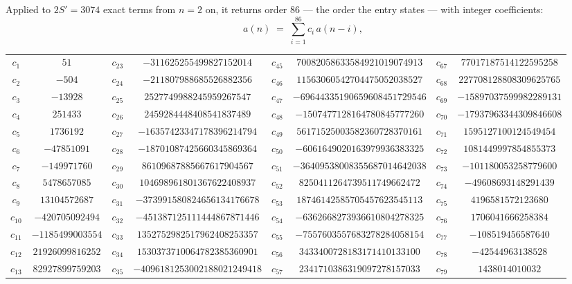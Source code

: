 \documentclass[11pt,a4paper]{article}
\theoremstyle{plain}
\theoremstyle{definition}
\begin{document}
Applied to $2S'=3074$ exact terms from $n=2$ on, it returns order $86$ --- the
order the entry states --- with integer coefficients:
\[
a(n)\;=\;\sum_{i=1}^{86}c_i\,a(n-i),
\]
\begin{center}\small
\begin{tabular}{cccccccc}
$c_{1}$ & $51$ & $c_{23}$ & $-311625255499827152014$ & $c_{45}$ & $70082058633584921019074913$ & $c_{67}$ & $77017187514122595258$ \\
$c_{2}$ & $-504$ & $c_{24}$ & $-211807988685526882356$ & $c_{46}$ & $11563060542704475052038527$ & $c_{68}$ & $227708128808309625765$ \\
$c_{3}$ & $-13928$ & $c_{25}$ & $2527749988245959267547$ & $c_{47}$ & $-69644335190659608451729546$ & $c_{69}$ & $-15897037599982289131$ \\
$c_{4}$ & $251433$ & $c_{26}$ & $2459284448408541837489$ & $c_{48}$ & $-1507477128164780845777260$ & $c_{70}$ & $-17937963344309846608$ \\
$c_{5}$ & $1736192$ & $c_{27}$ & $-16357423347178396214794$ & $c_{49}$ & $56171525003582360728370161$ & $c_{71}$ & $1595127100124549454$ \\
$c_{6}$ & $-47851091$ & $c_{28}$ & $-18701087425660345869364$ & $c_{50}$ & $-6061649020163979936383325$ & $c_{72}$ & $1081449997854855373$ \\
$c_{7}$ & $-149971760$ & $c_{29}$ & $86109687885667617904567$ & $c_{51}$ & $-36409538008355687014642038$ & $c_{73}$ & $-101180053258779600$ \\
$c_{8}$ & $5478657085$ & $c_{30}$ & $104698961801367622408937$ & $c_{52}$ & $8250411264739511749662472$ & $c_{74}$ & $-49608693148291439$ \\
$c_{9}$ & $13104572687$ & $c_{31}$ & $-373991580824656134176678$ & $c_{53}$ & $18746142585705457623545113$ & $c_{75}$ & $4196581572123680$ \\
$c_{10}$ & $-420705092494$ & $c_{32}$ & $-451387125111444867871446$ & $c_{54}$ & $-6362668273936610804278325$ & $c_{76}$ & $1706041666258384$ \\
$c_{11}$ & $-1185499003554$ & $c_{33}$ & $1352752982517962408253357$ & $c_{55}$ & $-7557603557683278284058154$ & $c_{77}$ & $-108519456587640$ \\
$c_{12}$ & $21926099816252$ & $c_{34}$ & $1530373710064782385360901$ & $c_{56}$ & $3433400728183171410133100$ & $c_{78}$ & $-42544963138528$ \\
$c_{13}$ & $82927899759203$ & $c_{35}$ & $-4096181253002188021249418$ & $c_{57}$ & $2341710386319097278157033$ & $c_{79}$ & $1438014010032$ \\

\end{tabular}
\end{center}
\end{document}
